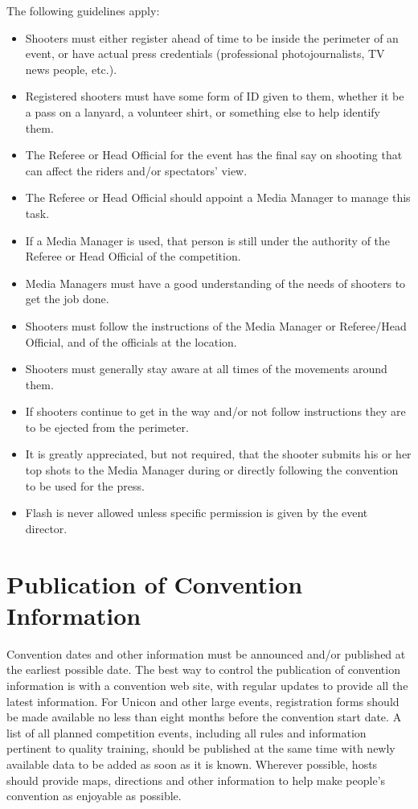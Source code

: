The following guidelines apply:
\begin{itemize}
\item Shooters must either register ahead of time to be inside the perimeter of an event, or have actual press credentials (professional photojournalists, TV news people, etc.).
\item Registered shooters must have some form of ID given to them, whether it be a pass on a lanyard, a volunteer shirt, or something else to help identify them.
\item The Referee or Head Official for the event has the final say on shooting that can affect the riders and/or spectators' view.
\item The Referee or Head Official should appoint a Media Manager to manage this task.
\item If a Media Manager is used, that person is still under the authority of the Referee or Head Official of the competition.
\item Media Managers must have a good understanding of the needs of shooters to get the job done.
\item Shooters must follow the instructions of the Media Manager or Referee/Head Official, and of the officials at the location.
\item Shooters must generally stay aware at all times of the movements around them.
\item If shooters continue to get in the way and/or not follow instructions they are to be ejected from the perimeter.
\item It is greatly appreciated, but not required, that the shooter submits his or her top shots to the Media Manager during or directly following the convention to be used for the press.
\item Flash is never allowed unless specific permission is given by the event director.
\end{itemize}

\section{Publication of Convention Information}

Convention dates and other information must be announced and/or published at the earliest possible date.
The best way to control the publication of convention information is with a convention web site, with regular updates to provide all the latest information.
For Unicon and other large events, registration forms should be made available no less than eight months before the convention start date.
A list of all planned competition events, including all rules and information pertinent to quality training, should be published at the same time with newly available data to be added as soon as it is known.
Wherever possible, hosts should provide maps, directions and other information to help make people's convention as enjoyable as possible.

